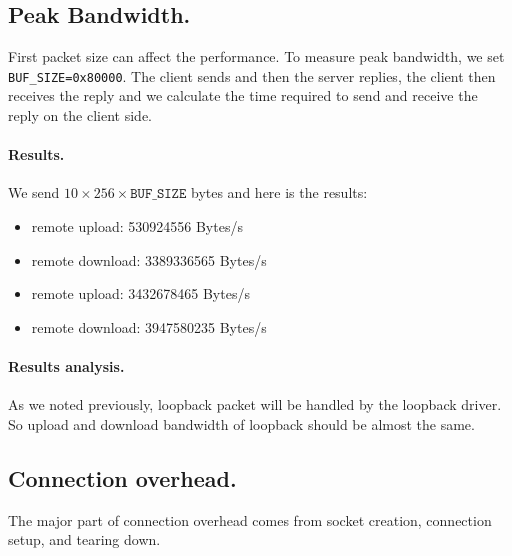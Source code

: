 \subsection{Peak Bandwidth.} 
First packet size can affect the performance. To measure peak bandwidth, we set \texttt{BUF\_SIZE=0x80000}. The client sends and then the server replies, the client then receives the reply and we calculate the time required to send and receive the reply on the client side.

\paragraph{Results.}
We send $10 \times 256 \times \texttt{BUF\_SIZE}$ bytes and here is the results:
\begin{itemize}[leftmargin=*]
	\item remote upload: 530924556 Bytes/s
	\item remote download: 3389336565 Bytes/s
\end{itemize}
\begin{itemize}[leftmargin=*]
	\item remote upload: 3432678465 Bytes/s
	\item remote download: 3947580235 Bytes/s
\end{itemize}
\paragraph{Results analysis.} As we noted previously, loopback packet will be handled by the loopback driver. So upload and download bandwidth of loopback should be almost the same. 

\subsection{Connection overhead.} The major part of connection overhead comes from socket creation, connection setup, and tearing down. 